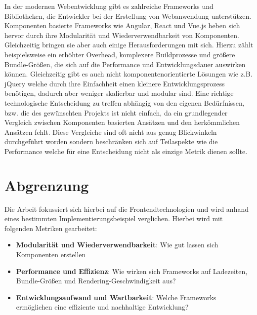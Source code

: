 \documentclass[oneside]{ausarbeitung}
\begin{document}
In der modernen Webentwicklung gibt es zahlreiche Frameworks und Bibliotheken, die Entwickler bei der Erstellung von Webanwendung unterstützen. Komponenten basierte Frameworks wie Angular, React und Vue.js heben sich hervor durch ihre Modularität und Wiederverwendbarkeit von Komponenten. Gleichzeitig bringen sie aber auch einige Herausforderungen mit sich. Hierzu zählt beispielsweise ein erhöhter Overhead, komplexere Buildprozesse und größere Bundle-Größen, die sich auf die Performance und Entwicklungsdauer auswirken können.
Gleichzeitig gibt es auch nicht komponentenorientierte Lösungen wie z.B. jQuery welche durch ihre Einfachheit einen kleinere Entwicklungsprozess benötigen, dadurch aber weniger skalierbar und modular sind. 
Eine richtige technologische Entscheidung zu treffen abhängig von den eigenen Bedürfnissen, bzw. die des gewünschten Projekts ist nicht einfach, da ein grundlegender Vergleich zwischen Komponenten basierten Ansätzen und den herkömmlichen Ansätzen fehlt. Diese Vergleiche sind oft nicht aus genug Blickwinkeln durchgeführt worden sondern beschränken sich auf Teilaspekte wie die Performance welche für eine Entscheidung nicht als einzige Metrik dienen sollte. 

\section{Abgrenzung}

Die Arbeit fokussiert sich hierbei auf die Frontendtechnologien und wird anhand eines bestimmten Implementierungsbeispiel verglichen. Hierbei wird mit folgenden Metriken gearbeitet: 
\begin{itemize}
    \item \textbf{Modularität und Wiederverwendbarkeit}:  
          Wie gut lassen sich Komponenten erstellen 
    \item \textbf{Performance und Effizienz}:  
          Wie wirken sich Frameworks auf Ladezeiten, Bundle-Größen und Rendering-Geschwindigkeit aus?
    \item \textbf{Entwicklungsaufwand und Wartbarkeit}:  
          Welche Frameworks ermöglichen eine effiziente und nachhaltige Entwicklung?
\end{itemize}
\end{document}
